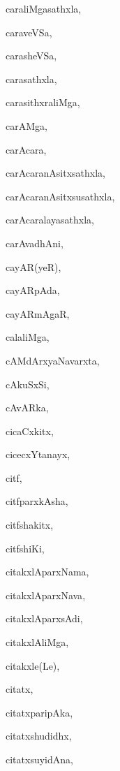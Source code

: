 \begin{multicols}{2}
{caraliMgasathxla}, \pageref{caraliMgasathxla}

{caraveVSa}, \pageref{caraveVSa}

{carasheVSa}, \pageref{carasheVSa}

{carasathxla}, \pageref{carasathxla}

{carasithxraliMga}, \pageref{carasithxraliMga}

{carAMga}, \pageref{carAMga}

{carAcara}, \pageref{carAcara}

{carAcaranAsitxsathxla}, \pageref{carAcaranAsitxsathxla}

{carAcaranAsitxsusathxla}, \pageref{carAcaranAsitxsusathxla}

{carAcaralayasathxla}, \pageref{carAcaralayasathxla}

{carAvadhAni}, \pageref{carAvadhAni}

{cayAR(yeR)}, \pageref{cayAR(yeR)}

{cayARpAda}, \pageref{cayARpAda}

{cayARmAgaR}, \pageref{cayARmAgaR}

{calaliMga}, \pageref{calaliMga}

{cAMdArxyaNavarxta}, \pageref{cAMdArxyaNavarxta}

{cAkuSxSi}, \pageref{cAkuSxSi}

{cAvARka}, \pageref{cAvARka}

{cicaCxkitx}, \pageref{cicaCxkitx}

{cicecxYtanayx}, \pageref{cicecxYtanayx}

{citf}, \pageref{citf}

{citfparxkAsha}, \pageref{citfparxkAsha}

{citfshakitx}, \pageref{citfshakitx}

{citfshiKi}, \pageref{citfshiKi}

{citakxlAparxNama}, \pageref{citakxlAparxNama}

{citakxlAparxNava}, \pageref{citakxlAparxNava}

{citakxlAparxsAdi}, \pageref{citakxlAparxsAdi}

{citakxlAliMga}, \pageref{citakxlAliMga}

{citakxle(Le)}, \pageref{citakxle(Le)}

{citatx}, \pageref{citatx}

{citatxparipAka}, \pageref{citatxparipAka}

{citatxshudidhx}, \pageref{citatxshudidhx}

{citatxsuyidAna}, \pageref{citatxsuyidAna}


\end{multicols}
